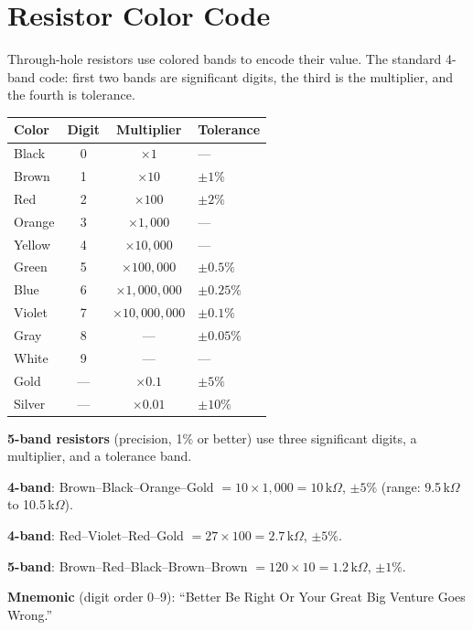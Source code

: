 \section{Resistor Color Code}

Through-hole resistors use colored bands to encode their value. The standard 4-band code: first two bands are significant digits, the third is the multiplier, and the fourth is tolerance.

\begin{center}
\begin{tabular}{lccl}
\toprule
\textbf{Color} & \textbf{Digit} & \textbf{Multiplier} & \textbf{Tolerance} \\
\midrule
Black   & 0 & $\times 1$         & --- \\
Brown   & 1 & $\times 10$        & $\pm 1\%$ \\
Red     & 2 & $\times 100$       & $\pm 2\%$ \\
Orange  & 3 & $\times 1{,}000$   & --- \\
Yellow  & 4 & $\times 10{,}000$  & --- \\
Green   & 5 & $\times 100{,}000$ & $\pm 0.5\%$ \\
Blue    & 6 & $\times 1{,}000{,}000$ & $\pm 0.25\%$ \\
Violet  & 7 & $\times 10{,}000{,}000$ & $\pm 0.1\%$ \\
Gray    & 8 & ---                & $\pm 0.05\%$ \\
White   & 9 & ---                & --- \\
Gold    & --- & $\times 0.1$     & $\pm 5\%$ \\
Silver  & --- & $\times 0.01$    & $\pm 10\%$ \\
\bottomrule
\end{tabular}
\end{center}

\textbf{5-band resistors} (precision, 1\% or better) use three significant digits, a multiplier, and a tolerance band.

\begin{tipbox}
\textbf{4-band}: Brown--Black--Orange--Gold $= 10 \times 1{,}000 = 10\,\text{k}\Omega$, $\pm 5\%$ (range: 9.5\,k$\Omega$ to 10.5\,k$\Omega$).

\textbf{4-band}: Red--Violet--Red--Gold $= 27 \times 100 = 2.7\,\text{k}\Omega$, $\pm 5\%$.

\textbf{5-band}: Brown--Red--Black--Brown--Brown $= 120 \times 10 = 1.2\,\text{k}\Omega$, $\pm 1\%$.

\textbf{Mnemonic} (digit order 0--9): ``Better Be Right Or Your Great Big Venture Goes Wrong.''
\end{tipbox}

